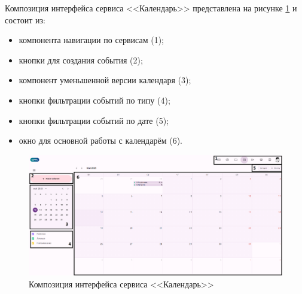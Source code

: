 Композиция интерфейса сервиса <<Календарь>> представлена на рисунке \ref{templ:image3} и состоит из:
\begin{itemize}
  \item компонента навигации по сервисам (1);
  \item кнопки для создания события (2);
  \item компонент уменьшенной версии календаря (3);
  \item кнопки фильтрации событий по типу (4);
  \item кнопки фильтрации событий по дате (5);
  \item окно для основной работы с календарём (6).
\end{itemize}
\begin{figure}[H]
	\centering
	\includegraphics[width=1\linewidth]{images/календарь}
	\caption{Композиция интерфейса сервиса <<Календарь>>}
	\label{templ:image3}
\end{figure}

